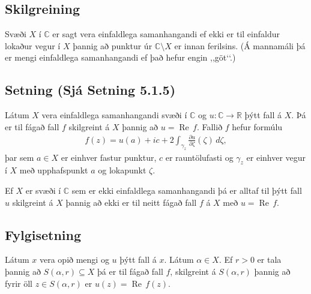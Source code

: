 \documentclass[a4paper,10pt,icelandic]{sphinxmanual}
\begin{document}
\subsection{Skilgreining}
\label{\detokenize{Kafli05:id1}}
Svæði \(X\) í \({\mathbb{C}}\) er sagt vera einfaldlega samanhangandi ef ekki er til einfaldur lokaður vegur í \(X\) þannig að punktur úr \({\mathbb{C}}\setminus X\) er innan ferilsins. (Á mannamáli þá er mengi einfaldlega samanhangandi ef það hefur engin ,,göt‘‘.)


\subsection{Setning (Sjá Setning 5.1.5)}
\label{\detokenize{Kafli05:setning-sja-setning-5-1-5}}
Látum \(X\) vera einfaldlega samanhangandi svæði í \({\mathbb{C}}\) og \(u:{\mathbb{C}}\to {\mathbb{R}}\) þýtt fall á \(X\). Þá er til fágað fall \(f\) skilgreint á \(X\) þannig að \(u=\operatorname{Re\, } f\). Fallið \(f\) hefur formúlu
\begin{equation*}
\begin{split}f(z)=u(a)+ic+2\int_{\gamma_z}\frac{\partial u}{\partial \zeta}(\zeta)\,d\zeta,\end{split}
\end{equation*}
þar sem \(a\in X\) er einhver fastur punktur, \(c\) er rauntölufasti og \(\gamma_z\) er einhver vegur í \(X\) með upphafspunkt \(a\) og lokapunkt \(\zeta\).

Ef \(X\) er svæði í \({\mathbb{C}}\) sem er ekki einfaldlega samanhangandi þá er alltaf til þýtt fall \(u\) skilgreint á \(X\) þannig að ekki er til neitt fágað fall \(f\) á \(X\) með \(u=\operatorname{Re\, } f\).


\subsection{Fylgisetning}
\label{\detokenize{Kafli05:fylgisetning}}
Látum \(x\) vera opið mengi og \(u\) þýtt fall á \(x\). Látum \(\alpha\in X\). Ef \(r>0\) er tala þannig að \(S(\alpha, r)\subseteq X\) þá er til fágað fall \(f\), skilgreint á \(S(\alpha, r)\) þannig að fyrir öll \(z\in S(\alpha,r)\) er \(u(z)=\operatorname{Re\, } f(z)\).
\end{document}
